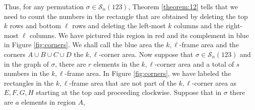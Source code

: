 \documentclass[
final,nomarks
]{dmtcs-episciences}
\newcommand{\tref}[1]{Theorem \ref{theorem:#1}}
\newcommand{\Sn}[1]{\mathcal{S}_{#1}}
\begin{document}
Thus, for any permutation \begin{math}\sigma\in\Sn{n}(123)\end{math}, \tref{12} tells that we need to count the numbers in the 
rectangle that are obtained by deleting the top \begin{math}k\end{math} rows and bottom \begin{math}\ell\end{math} rows and deleting 
the left-most \begin{math}k\end{math} columns and the right-most \begin{math}\ell\end{math} columns. We have pictured this region 
in red and its complement in blue in Figure \ref{fig:corners}. We shall call 
the blue area the \begin{math}k,\ell\end{math}-frame area and the corners \begin{math}A \cup B \cup C \cup D\end{math} 
the \begin{math}k,\ell\end{math}-corner area. Now suppose that \begin{math}\sigma \in \Sn{n}(123)\end{math} and in the graph 
of \begin{math}\sigma\end{math}, there are \begin{math}r\end{math} elements in the \begin{math}k,\ell\end{math}-corner area and a total of \begin{math}s\end{math} numbers 
in the \begin{math}k,\ell\end{math}-frame area. In Figure \ref{fig:corners}, we have labeled the rectangles in 
the \begin{math}k,\ell\end{math}-frame area that are not part of the \begin{math}k,\ell\end{math}-corner area as \begin{math}E,F,G,H\end{math} starting at the 
top and proceeding clockwise. Suppose that in \begin{math}\sigma\end{math} there are \begin{math}a\end{math} elements in region \begin{math}A\end{math}, 
\end{document}
